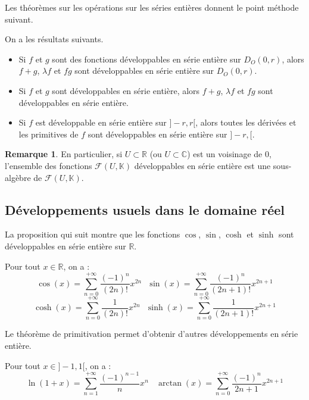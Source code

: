 \documentclass[french]{article}
\newcommand{\R}{\mathbb{R}}
\newcommand{\C}{\mathbb{C}}
\newcommand{\K}{\mathbb{K}}
\theoremstyle{plain}
\theoremstyle{definition}
\newtheorem*{rmq}{Remarque}
\theoremstyle{remark}
\begin{document}
Les théorèmes sur les opérations sur les séries entières donnent le point méthode suivant.

\begin{met}
	On a les résultats suivants.
	\begin{itemize}
		\item Si $f$ et $g$ sont des fonctions développables en série entière sur $D_O(0,r)$, alors $f+g$, $\lambda f$ et $fg$ sont développables en série entière sur $D_O(0,r)$.
		\item Si $f$ et $g$ sont développables en série entière, alors $f+g$, $\lambda f$ et $fg$ sont développables en série entière.
		\item Si $f$ est développable en série entière sur $]-r,r[$, alors toutes les dérivées et les primitives de $f$ sont développables en série entière sur $]-r,[$.
	\end{itemize}
	
\end{met}

\begin{rmq}
	En particulier, si $U\subset\R$ (ou $U\subset\C$) est un voisinage de $0$, l'ensemble des fonctions $\mathcal{F}(U,\K)$ développables en série entière est une sous-algèbre de $\mathcal{F}(U,\K)$.
\end{rmq}

\subsection{Développements usuels dans le domaine réel}

La proposition qui suit montre que les fonctions $\cos$, $\sin$, $\cosh$ et $\sinh$ sont développables en série entière sur $\R$.

\begin{prop}%
	Pour tout $x\in\R$, on a : $$\cos(x)=\sum_{n=0}^{+\infty}\frac{(-1)^n}{(2n)!}x^{2n}\ \ \ \sin(x)=\sum_{n=0}^{+\infty}\frac{(-1)^n}{(2n+1)!}x^{2n+1}$$
	$$\cosh(x)=\sum_{n=0}^{+\infty}\frac{1}{(2n)!}x^{2n}\ \ \ \sinh(x)=\sum_{n=0}^{+\infty}\frac{1}{(2n+1)!}x^{2n+1}$$
\end{prop}

Le théorème de primitivation permet d'obtenir d'autres développements en série entière.

\begin{prop}%
	Pour tout $x\in]-1,1[$, on a : $$\ln(1+x)=\sum_{n=1}^{+\infty}\frac{(-1)^{n-1}}{n}x^n\ \ \ \ \arctan(x)=\sum_{n=0}^{+\infty}\frac{(-1)^n}{2n+1}x^{2n+1}$$
\end{prop}
\end{document}
